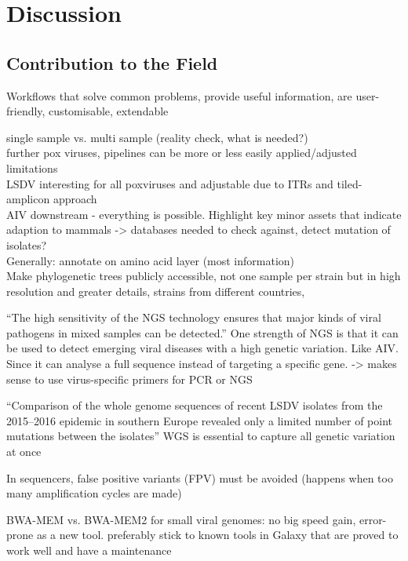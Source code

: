 \chapter{Discussion}\label{chap:discussion}
\todoit

\section{Contribution to the Field}
\todoit
Workflows that solve common problems, provide useful information, are user-friendly, customisable, extendable

single sample vs. multi sample (reality check, what is needed?) \\
further pox viruses, pipelines can be more or less easily applied/adjusted \\
limitations \\
\ac{LSDV} interesting for all poxviruses and adjustable due to \acp{ITR} and tiled-amplicon approach \\
\ac{AIV} downstream - everything is possible. Highlight key minor assets that indicate adaption to mammals -> databases needed to check against, detect mutation of isolates? \\
Generally: annotate on amino acid layer (most information) \\

Make phylogenetic trees publicly accessible, not one sample per strain but in high resolution and greater details, strains from different countries,

``The high sensitivity of the \ac{NGS} technology ensures that major kinds of viral pathogens in mixed samples can be detected.''
One strength of \ac{NGS} is that it can be used to detect emerging viral diseases with a high genetic variation. Like \ac{AIV}. Since it can analyse a full sequence instead of targeting a specific gene. -> makes sense to use virus-specific primers for \ac{PCR} or \ac{NGS} 

``Comparison of the whole genome sequences of recent \ac{LSDV} isolates from the 2015–2016 epidemic in southern Europe revealed only a limited number of point mutations between the isolates'' \ac{WGS} is essential to capture all genetic variation at once

In sequencers, false positive variants (\ac{FPV}) must be avoided (happens when too many amplification cycles are made)

BWA-MEM vs. BWA-MEM2 for small viral genomes: no big speed gain, error-prone as a new tool. preferably stick to known tools in Galaxy that are proved to work well and have a maintenance

